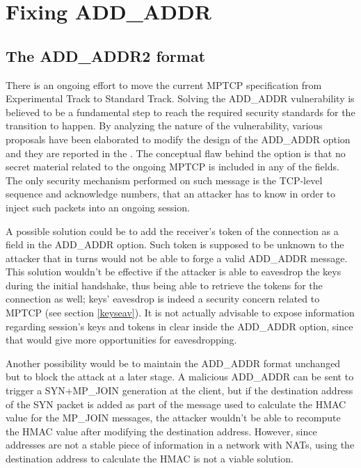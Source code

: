 \chapter{Fixing ADD\_ADDR}
\label{chap:addaddr2}

\section{The ADD\_ADDR2 format}
There is an ongoing effort to move the current MPTCP specification  from Experimental Track to Standard Track. Solving the ADD\_ADDR vulnerability is believed to be a fundamental step to reach the required security standards for the transition to happen.
By analyzing the nature of the vulnerability, various proposals have been elaborated to modify the design of the ADD\_ADDR option and they are reported in the . The conceptual flaw behind the option is that no secret material related to the ongoing MPTCP is included in any of the fields. The only security mechanism performed on such message is the TCP-level sequence and acknowledge numbers, that an attacker has to know in order to inject such packets into an ongoing session.

A possible solution could be to add the receiver's token of the connection as a field in the ADD\_ADDR option. Such token is supposed to be unknown to the attacker that in turns would not be able to forge a valid ADD\_ADDR message. This solution wouldn't be effective if the attacker is able to eavesdrop the keys during the initial handshake, thus being able to retrieve the tokens for the connection as well; keys' eavesdrop is indeed a security concern related to MPTCP (see section \ref{keyseav}). It is not actually advisable to expose information regarding session's keys and tokens in clear inside the ADD\_ADDR option, since that would give more opportunities for eavesdropping.

Another possibility would be to maintain the ADD\_ADDR format unchanged but to block the attack at a later stage. A malicious ADD\_ADDR can be sent to trigger a SYN+MP\_JOIN generation at the client, but if the destination address of the SYN packet is added as part of the message used to calculate the HMAC value  for the MP\_JOIN messages, the attacker wouldn't be able to recompute the HMAC value after modifying the destination address. However, since addresses are not a stable piece of information in a network with NATs, using the destination address to calculate the HMAC is not a viable solution.

